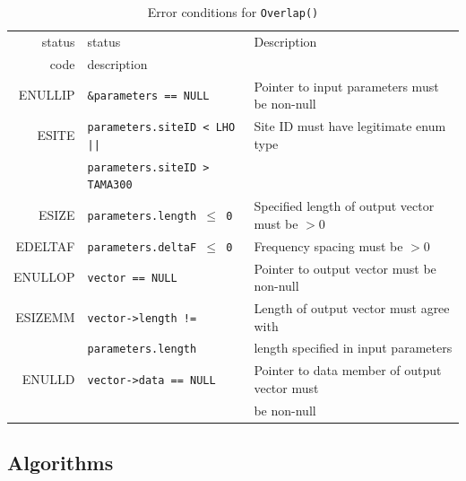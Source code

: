 \documentclass{article}
\begin{document}
\begin{table}
\begin{center}
\begin{tabular}{|r|l|l|}\hline
status & status & Description\\
code   & description &\\
\hline
ENULLIP& {\tt \&parameters == NULL\/}
& Pointer to input parameters must be non-null\\
ESITE&	{\tt parameters.siteID < LHO  ||\/}
& Site ID must have legitimate enum type\\ 
& {\tt parameters.siteID > TAMA300\/} & \\
ESIZE& 	{\tt parameters.length $\le$ 0\/}
& Specified length of output vector must be $>0$\\
EDELTAF & {\tt parameters.deltaF $\le$ 0\/}
& Frequency spacing must be $>0$\\
ENULLOP & {\tt vector == NULL} 
& Pointer to output vector must be non-null\\
ESIZEMM & {\tt vector->length !=\/}
& Length of output vector must agree with\\
& {\tt parameters.length\/}
& length specified in input parameters\\
ENULLD & {\tt vector->data == NULL\/}
& Pointer to data member of output vector must\\
&& be non-null\\
\hline
\end{tabular}
\end{center}
%
\caption{Error conditions for {\tt Overlap()\/}}
\label{t:errors}
\end{table}
                                
\subsection{Algorithms}
\end{document}
